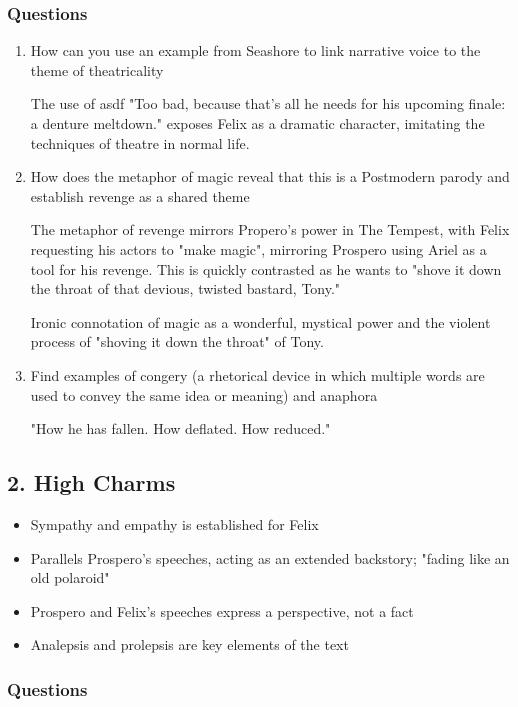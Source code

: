 		\subsubsection{Questions}
		
			\begin{enumerate}
				\item How can you use an example from Seashore to link narrative voice to the theme of theatricality

					The use of asdf "Too bad, because that’s all he needs for his upcoming finale: a denture meltdown." exposes Felix as a dramatic character, imitating the techniques of theatre in normal life.

				\item How does the metaphor of magic reveal that this is a Postmodern parody and establish revenge as a shared theme

					The metaphor of revenge mirrors Propero's power in The Tempest, with Felix requesting his actors to "make magic", mirroring Prospero using Ariel as a tool for his revenge. This is quickly contrasted as he wants to "shove it down the throat of that devious, twisted bastard, Tony."

					Ironic connotation of magic as a wonderful, mystical power and the violent process of "shoving it down the throat" of Tony.
				\item Find examples of congery (a rhetorical device in which multiple words are used to convey the same idea or meaning) and anaphora

					"How he has fallen. How deflated. How reduced."
			\end{enumerate}

	\subsection{2. High Charms}
	
		\begin{itemize}
			\item Sympathy and empathy is established for Felix
			\item Parallels Prospero's speeches, acting as an extended backstory; "fading like an old polaroid"
			\item Prospero and Felix's speeches express a perspective, not a fact
			\item Analepsis and prolepsis are key elements of the text
		\end{itemize}

		\subsubsection{Questions}
		
